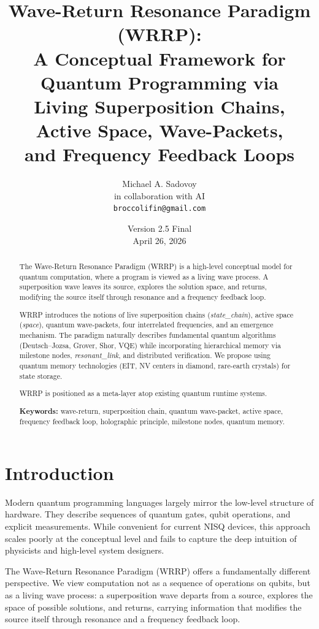 \documentclass[11pt,a4paper]{article}
\title{
    \textbf{Wave-Return Resonance Paradigm (WRRP):}\\
    \large A Conceptual Framework for Quantum Programming via\\
    Living Superposition Chains, Active Space, Wave-Packets,\\
    and Frequency Feedback Loops
}
\author{
    Michael A. Sadovoy\\
    \small in collaboration with AI\\
    \small \texttt{broccolifin@gmail.com}
}
\date{
    Version 2.5 Final \\
    April 26, 2026
}
\begin{document}
\maketitle

\begin{abstract}
\noindent
The Wave-Return Resonance Paradigm (WRRP) is a high-level conceptual model for quantum computation, where a program is viewed as a living wave process. A superposition wave leaves its source, explores the solution space, and returns, modifying the source itself through resonance and a frequency feedback loop.

WRRP introduces the notions of live superposition chains (\textit{state\_chain}), active space (\textit{space}), quantum wave-packets, four interrelated frequencies, and an emergence mechanism. The paradigm naturally describes fundamental quantum algorithms (Deutsch--Jozsa, Grover, Shor, VQE) while incorporating hierarchical memory via milestone nodes, \textit{resonant\_link}, and distributed verification. We propose using quantum memory technologies (EIT, NV centers in diamond, rare-earth crystals) for state storage.

WRRP is positioned as a meta-layer atop existing quantum runtime systems.

\medskip
\noindent\textbf{Keywords:} wave-return, superposition chain, quantum wave-packet, active space, frequency feedback loop, holographic principle, milestone nodes, quantum memory.
\end{abstract}

\section{Introduction}

Modern quantum programming languages largely mirror the low-level structure of hardware. They describe sequences of quantum gates, qubit operations, and explicit measurements. While convenient for current NISQ devices, this approach scales poorly at the conceptual level and fails to capture the deep intuition of physicists and high-level system designers.

The Wave-Return Resonance Paradigm (WRRP) offers a fundamentally different perspective. We view computation not as a sequence of operations on qubits, but as a living wave process: a superposition wave departs from a source, explores the space of possible solutions, and returns, carrying information that modifies the source itself through resonance and a frequency feedback loop.
\end{document}

